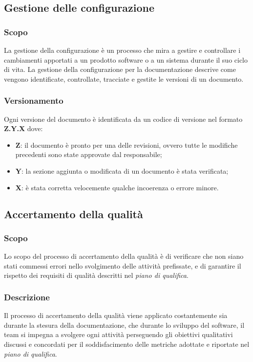     \subsection{Gestione delle configurazione}
        \subsubsection{Scopo}
        La gestione della configurazione è un processo che mira a gestire e controllare i cambiamenti apportati
        a un prodotto software o a un sistema durante il suo ciclo di vita. La gestione della configurazione per
        la documentazione descrive come vengono identificate, controllate, tracciate e gestite le versioni di un
        documento.
        \subsubsection{Versionamento}
        Ogni versione del documento è identificata da un codice di versione nel formato \textbf{Z.Y.X} dove:
        \begin{itemize}
            \item \textbf{Z}: il documento è pronto per una delle revisioni, ovvero tutte le modifiche precedenti sono state approvate dal responsabile;
            \item \textbf{Y}: la sezione aggiunta o modificata di un documento è stata verificata;
            \item \textbf{X}: è stata corretta velocemente qualche incoerenza o errore minore.
        \end{itemize}

    \subsection{Accertamento della qualità}
    \subsubsection{Scopo}
    Lo scopo del processo di accertamento della qualità è di verificare che non siano stati commessi errori nello svolgimento delle attività prefissate, e di garantire il rispetto dei requisiti di qualità descritti nel \textit{piano di qualifica}.
    \subsubsection{Descrizione}
    Il processo di accertamento della qualità viene applicato costantemente sia durante la stesura della documentazione, che durante lo sviluppo del software, il team si impegna a svolgere ogni attività perseguendo gli obiettivi qualitativi discussi e concordati per il soddisfacimento delle metriche adottate e riportate nel \textit{piano di qualifica}.    

